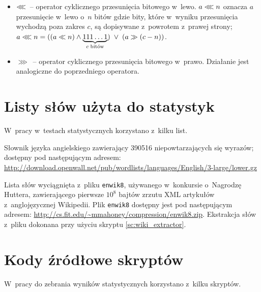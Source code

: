 \documentclass[12pt,a4paper,twoside]{article}
\newcounter{wlcounter} %
\begin{document}
\begin{appendices}
\begin{itemize}
        \item $\llless$~-- operator cyklicznego przesunięcia bitowego w~lewo.
        $a \llless n$ oznacza $a$ przesunięcie w~lewo o~$n$ bitów gdzie bity,
        które w~wyniku przesunięcia wychodzą poza zakres $c$, są dopisywane
        z~powrotem z~prawej strony; $a \llless n =\break ((a \ll n) \land
        \underbrace{111\ldots1}_{c\;\text{bitów}}) \;\lor\; (a \gg (c-n))$.

        \item $\ggg$~-- operator cyklicznego przesunięcia bitowego w~prawo.
        Działanie jest analogiczne do poprzedniego operatora.

    \end{itemize}

\pagebreak
\section{Listy słów użyta do statystyk}
\label{app:wordlists}
W~pracy w~testach statystycznych korzystano z~kilku list.

    \begin{myenumerate}

        \item {}\label{wl:english_wordlist} Słownik
        języka angielskiego zawierający 390516 niepowtarzających się wyrazów;
        dostępny pod następującym adresem:
        \url{http://download.openwall.net/pub/wordlists/languages/English/3-large/lower.gz}

        \item {}\label{wl:wiki_wordlist} Lista słów
        wyciągnięta z~pliku \texttt{enwik8}, używanego w~konkursie o~Nagrodzę
        Huttera, zawierającego pierwsze $10^8$ bajtów zrzutu XML artykułów
        z~anglojęzycznej \mbox{Wikipedii}. Plik \texttt{enwik8} dostępny jest
        pod następującym adresem:
        \url{http://cs.fit.edu/~mmahoney/compression/enwik8.zip}. Ekstrakcja
        słów z~pliku dokonana przy użyciu skryptu \ref{sc:wiki_extractor}.

    \end{myenumerate}

\section{Kody źródłowe skryptów}
W~pracy do zebrania wyników statystycznych korzystano z~kilku skryptów.

\begin{myenumerate}


\end{myenumerate}
\end{appendices}
\end{document}
